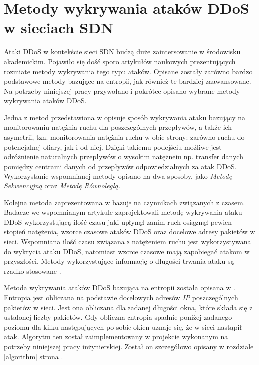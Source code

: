 \section{Metody wykrywania ataków DDoS w sieciach SDN}

Ataki DDoS w kontekście sieci SDN budzą duże zaintersowanie w środowisku
akademickim. Pojawiło się dość sporo artykułów naukowych prezentujących rozmiate
metody wykrywania tego typu ataków. Opisane zostały zarówno bardzo podstawowe
metody bazujące na entropii, jak również te bardziej zaawansowane. Na potrzeby
niniejszej pracy przywołano i pokrótce opisano wybrane metody wykrywania
ataków DDoS. 

Jedna z metod przedstawiona w \cite{ddosNYarticle} opisuje sposób wykrywania
ataku bazujący na monitorowaniu natężnia ruchu dla poszczególnych przepływów, a
także ich asymetrii, tzn. monitorowania natężnia ruchu w obie strony: zarówno
ruchu do potencjalnej ofiary, jak i od niej. Dzięki takiemu podejściu możliwe
jest odróżnienie naturalnych przepływów o wysokim natężneiu np. transfer danych
pomiędzy centrami danych od przepływów odpowiedzialnych za atak DDoS.
Wykorzystanie wspomnianej metody opisano na dwa sposoby, jako \textit{Metodę
  Sekwencyjną} oraz \textit{Metodę Równoległą}. 

Kolejna metoda zaprezentowana w \cite{ddoskoreaarticle} bazuje na czynnikach
związanych z czasem. Badacze we wspomnianym artykule zaprojektowali metodę
wykrywania ataku DDoS wykorzystującą ilość czasu jaki upłynął zanim ruch
osiągnął pewien stopień natężenia, wzorce czasowe ataków DDoS oraz docelowe
adresy pakietów w sieci. Wspomniana ilość czasu związana z natężeniem ruchu jest
wykorzystywana do wykrycia ataku DDoS, natomiast wzorce czasowe mają zapobiegać
atakom w przyszłości. Metody wykorzystujące informację o długości trwania ataku
są rzadko stosowane \cite{ddoskoreaarticle}. 

Metoda wykrywania ataków DDoS bazująca na entropii została opisana w
\cite{mainddosarticle}. Entropia jest obliczana na podstawie docelowych adresów
\textit{IP} poszczególnych pakietów w sieci. Jest ona obliczana dla zadanej
długości okna, które składa się z ustalonej liczby pakietów. Gdy obliczna
entropia spadnie poniżej zadanego poziomu dla kilku następujących po sobie okien
uznaje się, że w sieci nastąpił atak. Algorytm ten został zaimplementowany w
projekcie wykonanym na potrzeby niniejszej pracy inżynierskiej. Został on
szczegółowo opisany w rozdziale \ref{algorithm} strona \pageref{algorithm}.

